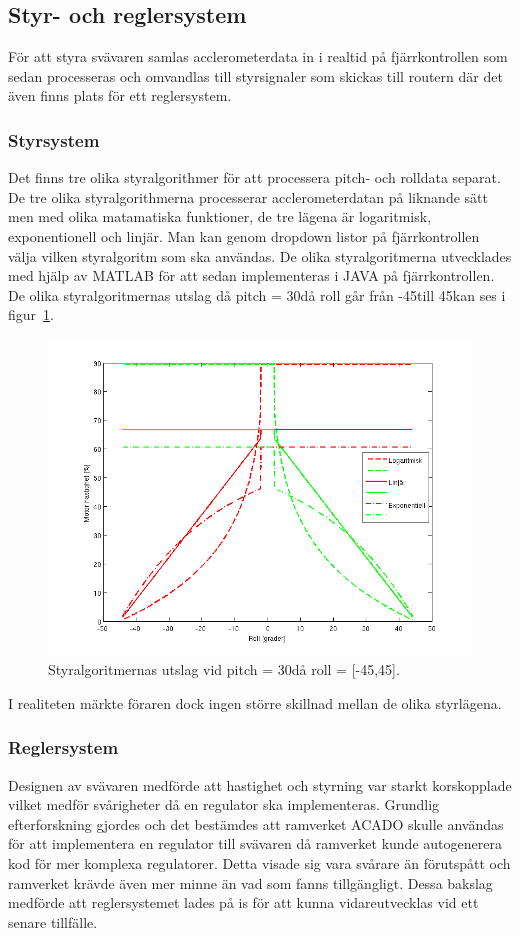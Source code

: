 \subsection{Styr- och reglersystem}
För att styra svävaren samlas acclerometerdata in i realtid på fjärrkontrollen som sedan processeras och omvandlas till styrsignaler som skickas till routern där det även finns plats för ett reglersystem.

\subsubsection{Styrsystem}
Det finns tre olika styralgorithmer för att processera pitch- och rolldata separat. De tre olika styralgorithmerna processerar acclerometerdatan på liknande sätt men med olika matamatiska funktioner, de tre lägena är logaritmisk, exponentionell och linjär. Man kan genom dropdown listor på fjärrkontrollen välja vilken styralgoritm som ska användas. De olika styralgoritmerna utvecklades med hjälp av MATLAB för att sedan implementeras i JAVA på fjärrkontrollen. De olika styralgoritmernas utslag då pitch = 30\degree  då roll går från -45\degree till 45\degree  kan ses i figur~\ref{fig:styralgoritmer}.

\begin{figure}[htbp!]
\centering
\includegraphics[width=12cm]{../../includes/figures/Styralgoritmer}
\caption{Styralgoritmernas utslag vid pitch = 30\degree då roll = [-45,45].}
\label{fig:styralgoritmer}
\end{figure}

I realiteten märkte föraren dock ingen större skillnad mellan de olika styrlägena. 

\subsubsection{Reglersystem}
Designen av svävaren medförde att hastighet och styrning var starkt korskopplade vilket medför svårigheter då en regulator ska implementeras. Grundlig efterforskning gjordes och det bestämdes att ramverket ACADO skulle användas för att implementera en regulator till svävaren då ramverket kunde autogenerera kod för mer komplexa regulatorer. Detta visade sig vara svårare än förutspått och ramverket krävde även mer minne än vad som fanns tillgängligt. Dessa bakslag medförde att reglersystemet lades på is för att kunna vidareutvecklas vid ett senare tillfälle.
